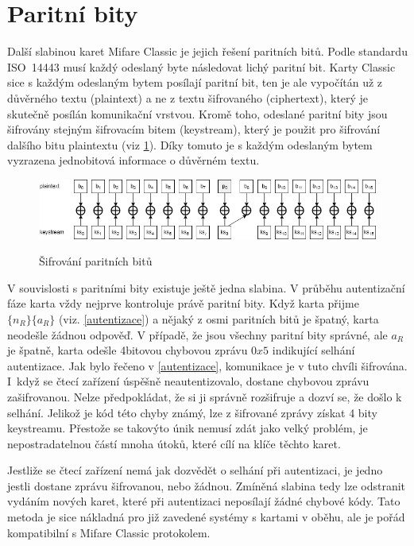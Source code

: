 \section{Paritní bity}
\label{paritni_bity}
Další slabinou karet Mifare Classic je jejich řešení paritních bitů. Podle standardu ISO~14443 musí každý odeslaný byte následovat lichý paritní bit. Karty Classic sice s každým odeslaným bytem posílají paritní bit, ten je ale vypočítán už z důvěrného textu (plaintext) a ne z textu šifrovaného (ciphertext), který je skutečně posílán komunikační vrstvou. Kromě toho, odeslané paritní bity jsou šifrovány stejným šifrovacím bitem (keystream), který je použit pro šifrování dalšího bitu plaintextu (viz \ref{parityDiagram})\cite{Cryptanalisis}.
Díky tomuto je s každým odeslaným bytem vyzrazena jednobitová informace o důvěrném textu\cite{Dismantling_Mifare_Classic}. 
\begin{figure}[ht]\centering
  \centering
  \includegraphics[width=\linewidth]{obrazky-figures/parityBits.png}\\[1pt]  
  \caption{Šifrování paritních bitů \cite{Cryptanalisis}}   
  \label{parityDiagram}
\end{figure}
\par
V souvislosti s paritními bity existuje ještě jedna slabina. V průběhu autentizační fáze karta vždy nejprve kontroluje právě paritní bity. Když karta přijme $\{n_R\}\{a_R\}$ (viz. \ref{autentizace}) a nějaký z osmi paritních bitů je špatný, karta neodešle žádnou odpověď. V případě, že jsou všechny paritní bity správné, ale $a_R$ je špatně, karta odešle 4bitovou chybovou zprávu $0x5$ indikující selhání autentizace. Jak bylo řečeno v \ref{autentizace}, komunikace je v tuto chvíli šifrována. I~když se čtecí zařízení úspěšně neautentizovalo, dostane chybovou zprávu zašifrovanou. Nelze předpokládat, že si ji správně rozšifruje a dozví se, že došlo k selhání.
Jelikož je kód této chyby známý, lze z šifrované zprávy získat 4 bity keystreamu. Přestože se takovýto únik nemusí zdát jako velký problém, je nepostradatelnou částí mnoha útoků, které cílí na klíče těchto karet.
\par
Jestliže se čtecí zařízení nemá jak dozvědět o selhání při autentizaci, je jedno jestli dostane zprávu šifrovanou, nebo žádnou. Zmíněná slabina tedy lze odstranit vydáním nových karet, které při autentizaci neposílají žádné chybové kódy. Tato metoda je sice nákladná pro již zavedené systémy s kartami v oběhu, ale je pořád kompatibilní s Mifare Classic protokolem\cite{Cryptanalisis}. 

